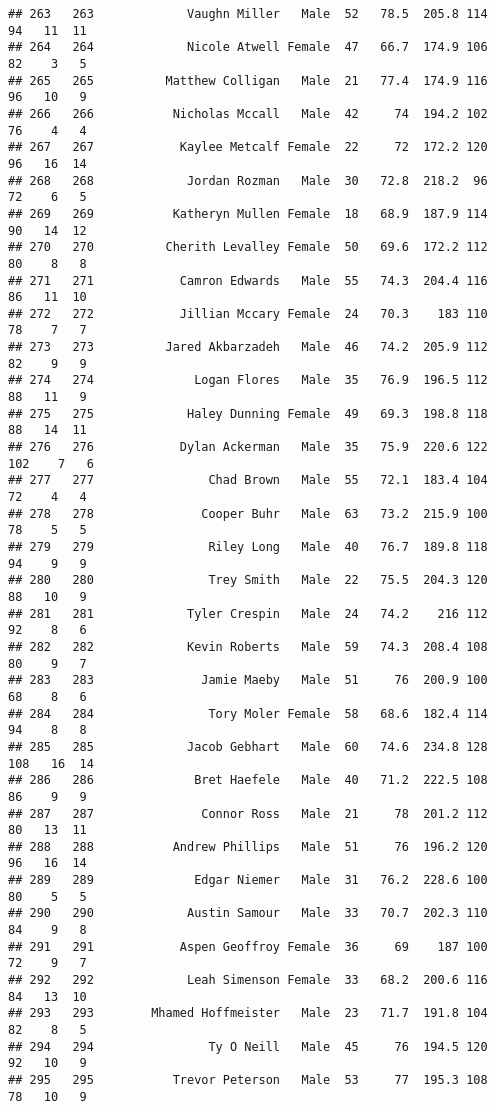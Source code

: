 \documentclass[
]{article}
\begin{document}
\begin{verbatim}
## 263   263             Vaughn Miller   Male  52   78.5  205.8 114  94   11  11
## 264   264             Nicole Atwell Female  47   66.7  174.9 106  82    3   5
## 265   265          Matthew Colligan   Male  21   77.4  174.9 116  96   10   9
## 266   266           Nicholas Mccall   Male  42     74  194.2 102  76    4   4
## 267   267            Kaylee Metcalf Female  22     72  172.2 120  96   16  14
## 268   268             Jordan Rozman   Male  30   72.8  218.2  96  72    6   5
## 269   269           Katheryn Mullen Female  18   68.9  187.9 114  90   14  12
## 270   270          Cherith Levalley Female  50   69.6  172.2 112  80    8   8
## 271   271            Camron Edwards   Male  55   74.3  204.4 116  86   11  10
## 272   272            Jillian Mccary Female  24   70.3    183 110  78    7   7
## 273   273          Jared Akbarzadeh   Male  46   74.2  205.9 112  82    9   9
## 274   274              Logan Flores   Male  35   76.9  196.5 112  88   11   9
## 275   275             Haley Dunning Female  49   69.3  198.8 118  88   14  11
## 276   276            Dylan Ackerman   Male  35   75.9  220.6 122 102    7   6
## 277   277                Chad Brown   Male  55   72.1  183.4 104  72    4   4
## 278   278               Cooper Buhr   Male  63   73.2  215.9 100  78    5   5
## 279   279                Riley Long   Male  40   76.7  189.8 118  94    9   9
## 280   280                Trey Smith   Male  22   75.5  204.3 120  88   10   9
## 281   281             Tyler Crespin   Male  24   74.2    216 112  92    8   6
## 282   282             Kevin Roberts   Male  59   74.3  208.4 108  80    9   7
## 283   283               Jamie Maeby   Male  51     76  200.9 100  68    8   6
## 284   284                Tory Moler Female  58   68.6  182.4 114  94    8   8
## 285   285             Jacob Gebhart   Male  60   74.6  234.8 128 108   16  14
## 286   286              Bret Haefele   Male  40   71.2  222.5 108  86    9   9
## 287   287               Connor Ross   Male  21     78  201.2 112  80   13  11
## 288   288           Andrew Phillips   Male  51     76  196.2 120  96   16  14
## 289   289              Edgar Niemer   Male  31   76.2  228.6 100  80    5   5
## 290   290             Austin Samour   Male  33   70.7  202.3 110  84    9   8
## 291   291            Aspen Geoffroy Female  36     69    187 100  72    9   7
## 292   292             Leah Simenson Female  33   68.2  200.6 116  84   13  10
## 293   293        Mhamed Hoffmeister   Male  23   71.7  191.8 104  82    8   5
## 294   294                Ty O Neill   Male  45     76  194.5 120  92   10   9
## 295   295           Trevor Peterson   Male  53     77  195.3 108  78   10   9

\end{verbatim}
\end{document}
